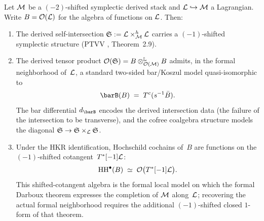 \begin{theorem}
Let $\mathcal M$ be a $(-2)$-shifted symplectic derived stack and
$\mathcal L \hookrightarrow \mathcal M$ a Lagrangian. Write
$B = \mathcal O(\mathcal L)$ for the algebra of functions on $\mathcal L$.
Then:
\begin{enumerate}[label=\textup{(\roman*)},leftmargin=2em]
\item The derived self-intersection
 $\mathfrak{S} := \mathcal L \times_{\mathcal M}^h \mathcal L$
 carries a $(-1)$-shifted symplectic structure
 \textup{(}PTVV \cite{PTVV13}, Theorem~2.9\textup{)}.
\item The derived tensor product
 $\mathcal O(\mathfrak{S})=B\otimes^{\mathbb L}_{\mathcal O(\mathcal M)}B$
 admits, in the formal neighborhood of~$\mathcal L$, a standard
 two-sided bar/Koszul model quasi-isomorphic to
 \begin{equation}\label{eq:bar-is-sheaf}
 \barB(B)
 \;=\;
 T^c(s^{-1}\bar B).
 \end{equation}
 The bar differential $d_{\barB}$ encodes the derived
 intersection data \textup{(}the failure of the intersection to be
 transverse\textup{)}, and the cofree coalgebra structure models
 the diagonal
 $\mathfrak{S} \to \mathfrak{S} \times_{\mathcal L} \mathfrak{S}$.
\item Under the HKR identification, Hochschild cochains of~$B$
 are functions on the $(-1)$-shifted cotangent~$T^*[-1]\mathcal L$:
 \begin{equation}\label{eq:hkr-bulk}
 \operatorname{HH}^\bullet(B)
 \;\simeq\;
 \mathcal O\bigl(T^*[-1]\mathcal L\bigr).
 \end{equation}
 This shifted-cotangent algebra is the formal local model on
 which the formal Darboux theorem expresses the completion of
 $\mathcal M$ along~$\mathcal L$; recovering the actual formal neighborhood
 requires the additional $(-1)$-shifted closed $1$-form of that
 theorem.
\end{enumerate}
\end{theorem}

